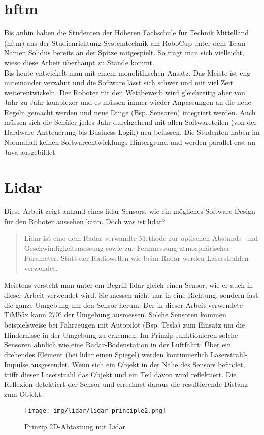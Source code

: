 \section{\acrfull{hftm}}
Bis anhin haben die Studenten der Höheren Fachschule für Technik Mittelland (\acrshort{hftm}) aus der Studienrichtung Systemtechnik am RoboCup unter dem Team-Namen Solidus bereits an der Spitze mitgespielt. So fragt man sich vielleicht, wieso diese Arbeit überhaupt zu Stande kommt. \\ Bis heute entwickelt man mit einem monolithischen Ansatz. Das Meiste ist eng miteinander verzahnt und die Software lässt sich schwer und mit viel Zeit weiterentwickeln. Der Roboter für den Wettbewerb wird gleichzeitig aber von Jahr zu Jahr komplexer und es müssen immer wieder Anpassungen an die neue Regeln gemacht werden und neue Dinge (Bsp. Sensoren) integriert werden. Auch müssen sich die Schüler jedes Jahr durchgehend mit allen Softwareteilen (von der Hardware-Ansteuerung bis Business-Logik) neu befassen. Die Studenten haben im Normalfall keinen Softwareentwicklungs-Hintergrund und werden parallel erst an Java ausgebildet.

\section{Lidar}
Diese Arbeit zeigt anhand eines \acrshort{lidar}-Sensors, wie ein mögliches Software-Design für den Roboter aussehen kann. Doch was ist \acrshort{lidar}?
\begin{quote}
	Lidar ist eine dem Radar verwandte Methode zur optischen Abstands- und Geschwindigkeitsmessung sowie zur Fernmessung atmosphärischer Parameter. Statt der Radiowellen wie beim Radar werden Laserstrahlen verwendet. \cite{wikipedia-lidar}
\end{quote}
Meistens versteht man unter em Begriff \acrshort{lidar} gleich einen Sensor, wie er auch in dieser Arbeit verwendet wird. Sie messen nicht nur in eine Richtung, sondern fast die ganze Umgebung um den Sensor herum. Der in dieser Arbeit verwendete TiM55x kann 270° der Umgebung ausmessen. Solche Sensoren kommen beispielsweise bei Fahrzeugen mit Autopilot (Bsp. Tesla) zum Einsatz um die Hindernisse in der Umgebung zu erkennen. Im Prinzip funktionieren solche Sensoren ähnlich wie eine Radar-Bodenstation in der Luftfahrt: Über ein drehendes Element (bei \acrshort{lidar} einen Spiegel) werden kontinuierlich Laserstrahl-Impulse ausgesendet. Wenn sich ein Objekt in der Nähe des Sensors befindet, trifft dieser Laserstrahl das Objekt und ein Teil davon wird reflektiert. Die Reflexion detektiert der Sensor und errechnet daraus die resultierende Distanz zum Objekt.
\begin{figure}[H]
	\centering
	\texttt{[image: img/lidar/lidar-principle2.png]}
	\caption{Prinzip 2D-Abtastung mit Lidar \cite{wikipedia-lidar}}
	\label{fig:lidar-principle}
\end{figure}



